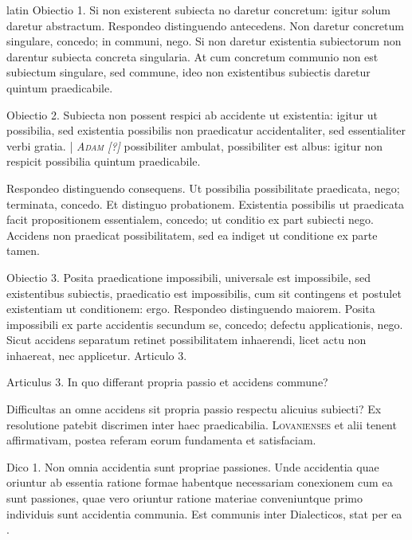 \begin{otherlanguage*}{latin}
\pstart
Obiectio 1. Si non existerent subiecta no daretur concretum:
igitur solum daretur abstractum. Respondeo distinguendo antecedens. Non daretur concretum singulare, concedo; in communi, nego. Si non daretur existentia subiectorum non darentur subiecta concreta singularia. At cum concretum communio non est subiectum singulare, sed commune, ideo non existentibus subiectis daretur quintum praedicabile. 
\pend

\pstart
Obiectio 2. Subiecta non possent respici ab accidente ut existentia:
igitur ut possibilia, sed existentia possibilis non praedicatur accidentaliter, sed essentialiter verbi gratia. \textnormal{|} \textsc{\emph{Adam [?]}}\index[persons]{} possibiliter ambulat, possibiliter est albus:
igitur non respicit possibilia quintum praedicabile. 
\pend

\pstart
Respondeo distinguendo consequens. Ut possibilia possibilitate praedicata, nego; terminata, concedo. Et distinguo probationem. Existentia possibilis ut praedicata facit propositionem essentialem, concedo; ut conditio ex part subiecti nego. Accidens non praedicat possibilitatem, sed ea indiget ut conditione ex parte tamen. 
\pend

\pstart
Obiectio 3. Posita praedicatione impossibili, universale est impossibile, sed existentibus subiectis, praedicatio est impossibilis, cum sit contingens et postulet existentiam ut conditionem:
ergo. Respondeo distinguendo maiorem. Posita impossibili ex parte accidentis secundum se, concedo; defectu applicationis, nego. Sicut accidens separatum retinet possibilitatem inhaerendi, licet actu non inhaereat, nec applicetur. Articulo 3. 
\pend

\pstart
{}
\pend

\pstart
\noindent%
Articulus 3. In quo differant propria passio et accidens commune? 
\pend

\pstart
Difficultas an omne accidens sit propria passio respectu alicuius subiecti? Ex resolutione patebit discrimen inter haec praedicabilia. \textsc{Lovanienses}\index[persons]{} et alii tenent affirmativam, postea referam eorum fundamenta et satisfaciam. 
\pend

\pstart
Dico 1. Non omnia accidentia sunt propriae passiones. Unde accidentia quae oriuntur ab essentia ratione formae habentque necessariam conexionem cum ea sunt passiones, quae vero oriuntur ratione materiae conveniuntque primo individuis sunt accidentia communia. Est communis inter Dialecticos, stat per ea . 
\pend


\end{otherlanguage*}
